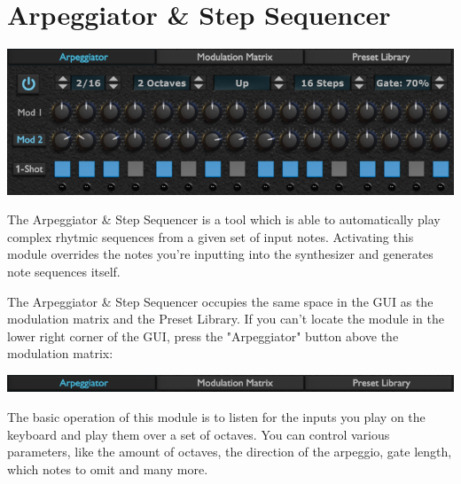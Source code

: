 \chapter{Arpeggiator \& Step Sequencer}
\label{arpeggiator}

\begin{center}
    \includegraphics[width=\textwidth]{graphics/arpeggiator.png}
\end{center}

The Arpeggiator \& Step Sequencer is a tool which is able to automatically play complex rhytmic sequences from a given set of input notes. Activating this module overrides the notes you're inputting into the synthesizer and generates note sequences itself.

\begin{tcolorbox}[colback=yellow!10!white,
    colframe=white!20!black,
    center,
    valign=top,
    halign=left,
    center title,
    width=\textwidth]

    The Arpeggiator \& Step Sequencer occupies the same space in the GUI as the modulation matrix and the Preset Library. If you can't locate the module in the lower right corner of the GUI, press the "Arpeggiator" button above the modulation matrix:

    \begin{center}
        \includegraphics[width=\textwidth]{graphics/arpeggiator_button.png}
    \end{center}
\end{tcolorbox}

The basic operation of this module is to listen for the inputs you play on the keyboard and play them over a set of octaves. You can control various parameters, like the amount of octaves, the direction of the arpeggio, gate length, which notes to omit and many more.


